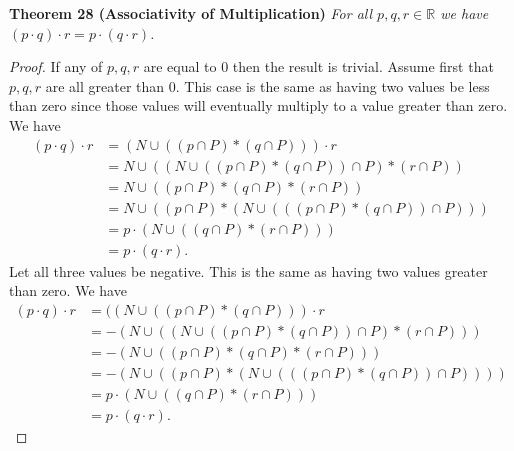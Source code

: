 \documentclass{article}
\begin{document}
\begin{flushleft}
\textbf{Theorem 28 (Associativity of Multiplication)}
\textsl{For all $p,q,r \in \mathbb{R}$ we have $(p \cdot q) \cdot r = p \cdot (q \cdot r)$.}
\begin{proof}
If any of $p,q,r$ are equal to $0$ then the result is trivial. Assume first that $p,q,r$ are all greater than $0$. This case is the same as having two values be less than zero since those values will eventually multiply to a value greater than zero. We have
\begin{align*}
(p \cdot q) \cdot r &=(N \cup ((p \cap P) * (q \cap P))) \cdot r \\
				&=N \cup ((N \cup ((p \cap P) * (q \cap P)) \cap P) * (r \cap P)) \\
				&=N \cup ((p \cap P) * (q \cap P) * (r \cap P)) \\
				&=N \cup ((p \cap P) * (N \cup (((p \cap P) * (q \cap P)) \cap P))) \\
				&=p \cdot (N \cup ((q \cap P) * (r \cap P))) \\
				&=p \cdot (q \cdot r).
\end{align*}
Let all three values be negative. This is the same as having two values greater than zero. We have
\begin{align*}
(p \cdot q) \cdot r &=((N \cup ((p \cap P) * (q \cap P))) \cdot r \\
				&=-(N \cup ((N \cup ((p \cap P) * (q \cap P)) \cap P) * (r \cap P))) \\
				&=-(N \cup ((p \cap P) * (q \cap P) * (r \cap P))) \\
				&=-(N \cup ((p \cap P) * (N \cup (((p \cap P) * (q \cap P)) \cap P)))) \\
				&=p \cdot (N \cup ((q \cap P) * (r \cap P))) \\
				&=p \cdot (q \cdot r).
\end{align*}
\end{proof}


\end{flushleft}
\end{document}
